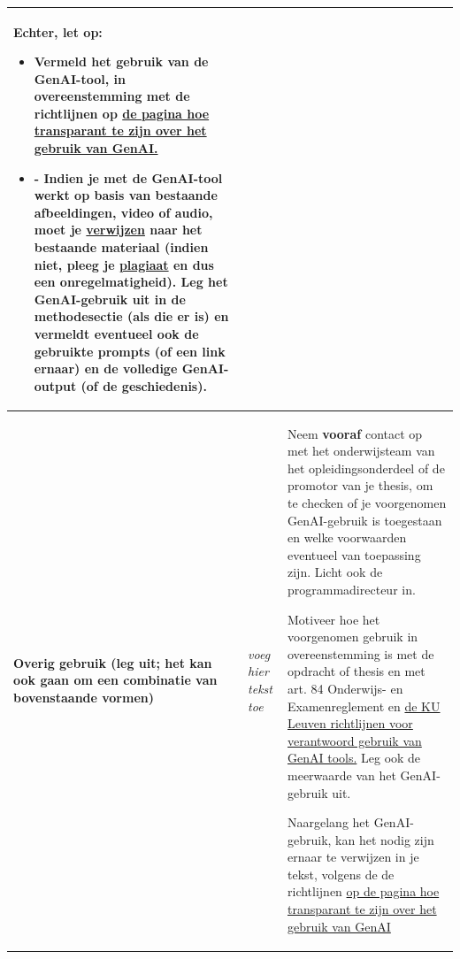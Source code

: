 \begin{longtable}{|p{}|p{}|p{}|}
\medskip
\textbf{Echter, let op:}
\begin{itemize}
    \item \textbf{Vermeld het gebruik van de GenAI-tool,} in overeenstemming met de richtlijnen op \href{https://www.kuleuven.be/onderwijs/student/onderwijstools/artificiele-intelligentie#Transparantie}{de pagina hoe transparant te zijn over het gebruik van GenAI.}
    \item -	Indien je met de GenAI-tool werkt op basis van bestaande afbeeldingen, video of audio, moet je \href{https://bib.kuleuven.be/training-en-tutorials/citeren/basisprincipes}{verwijzen} naar het \textbf{bestaande materiaal} (indien niet, pleeg je \href{https://www.kuleuven.be/onderwijs/plagiaat/index}{plagiaat} en dus een onregelmatigheid). Leg het GenAI-gebruik uit in de methodesectie (als die er is) en vermeldt eventueel ook de gebruikte prompts (of een link ernaar) en de volledige GenAI-output (of de geschiedenis). 
\end{itemize} \\ \hline
\textbf{Overig gebruik (leg uit; het kan ook gaan om een combinatie van bovenstaande vormen)} & \textit{voeg hier tekst toe} & Neem \textbf{vooraf} contact op met het onderwijsteam van het opleidingsonderdeel of de promotor van je thesis, om te checken of je voorgenomen GenAI-gebruik is toegestaan en welke voorwaarden eventueel van toepassing zijn. Licht ook de programmadirecteur in.

Motiveer hoe het voorgenomen gebruik in overeenstemming is met de opdracht of thesis en met art. 84 Onderwijs- en Examenreglement en \href{https://www.kuleuven.be/genai}{de KU Leuven richtlijnen voor verantwoord gebruik van GenAI tools.} Leg ook de meerwaarde van het GenAI-gebruik uit. 

Naargelang het GenAI-gebruik, kan het nodig zijn ernaar te verwijzen in je tekst, volgens de de richtlijnen \href{https://www.kuleuven.be/onderwijs/student/onderwijstools/artificiele-intelligentie#Transparantie}{op de pagina hoe transparant te zijn over het gebruik van GenAI}
\\ \hline
\end{longtable}